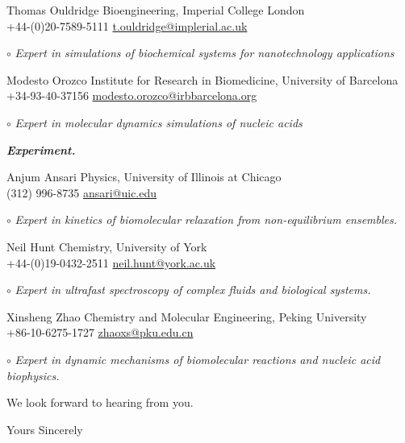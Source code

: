 \documentclass[11pt,a4paper]{letter} %
\begin{document}
\begin{letter}
Thomas Ouldridge \hfill  Bioengineering, Imperial College London \\
+44-(0)20-7589-5111 \hfill \url{t.ouldridge@implerial.ac.uk}

$\circ$ \textit{Expert in simulations of biochemical systems for nanotechnology applications }

Modesto Orozco \hfill  Institute for Research in Biomedicine, University of Barcelona \\
+34-93-40-37156 \hfill \url{modesto.orozco@irbbarcelona.org}

$\circ$ \textit{Expert in molecular dynamics simulations of nucleic acids }

\textbf{\textit{Experiment.}}

Anjum Ansari \hfill Physics, University of Illinois at Chicago\\
(312) 996-8735 \hfill \url{ansari@uic.edu}

$\circ$ \textit{Expert in kinetics of biomolecular relaxation from non-equilibrium ensembles.}

Neil Hunt \hfill Chemistry, University of York \\
+44-(0)19-0432-2511 \hfill \url{neil.hunt@york.ac.uk}

$\circ$ \textit{Expert in ultrafast spectroscopy of complex fluids and biological systems.}

Xinsheng Zhao \hfill Chemistry and Molecular Engineering, Peking University \\
+86-10-6275-1727 \hfill \url{zhaoxs@pku.edu.cn}

$\circ$ \textit{Expert in dynamic mechanisms of biomolecular reactions and nucleic acid biophysics.}


We look forward to hearing from you.

\closing{Yours Sincerely}

\end{letter}




%
%
\end{document}
